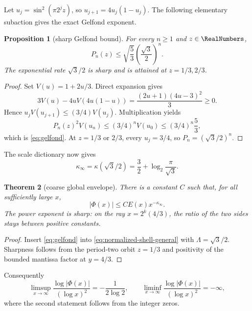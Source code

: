 \documentclass[11pt,oneside]{article}
\newtheorem{theorem}{Theorem}[section]
\newtheorem{proposition}[theorem]{Proposition}
\theoremstyle{definition}
\theoremstyle{remark}
\begin{document}
Let \(u_j=\sin^2(\pi2^jz)\), so
\(u_{j+1}=4u_j(1-u_j)\).  The following elementary subaction gives the exact
Gelfond exponent.

\begin{proposition}[sharp Gelfond bound]
\label{prop:gelfond}
For every \(n\ge1\) and \(z\in\RealNumbers\),
\begin{equation}
 P_n(z)\le\sqrt{\frac53}\left(\frac{\sqrt3}{2}\right)^n.
 \label{eq:gelfond}
\end{equation}
The exponential rate \(\sqrt3/2\) is sharp and is attained at
\(z=1/3,2/3\).
\end{proposition}

\begin{proof}
Set \(V(u)=1+2u/3\).  Direct expansion gives
\begin{equation}
 3V(u)-4uV(4u(1-u))
 =\frac{(2u+1)(4u-3)^2}{3}\ge0.
 \label{eq:subaction-identity}
\end{equation}
Hence
\(u_jV(u_{j+1})\le(3/4)V(u_j)\).  Multiplication yields
\[
 P_n(z)^2V(u_n)\le(3/4)^nV(u_0)
 \le(3/4)^n\frac53,
\]
which is \eqref{eq:gelfond}.  At \(z=1/3\) or \(2/3\), every
\(u_j=3/4\), so \(P_n=(\sqrt3/2)^n\).
\end{proof}

The scale dictionary now gives
\begin{equation}
 \kappa_\infty
 =\kappa(\sqrt3/2)
 =\frac32+\log_2\frac\pi{\sqrt3}.
 \label{eq:kappainfty}
\end{equation}

\begin{theorem}[coarse global envelope]
\label{thm:coarse-envelope}
There is a constant \(C\) such that, for all sufficiently large \(x\),
\begin{equation}
 |\Phi(x)|\le C E(x)x^{-\kappa_\infty}.
 \label{eq:coarse-envelope}
\end{equation}
The power exponent is sharp: on the ray \(x=2^k(4/3)\), the ratio of the two
sides stays between positive constants.
\end{theorem}

\begin{proof}
Insert \eqref{eq:gelfond} into
\eqref{eq:normalized-shell-general} with
\(\Lambda=\sqrt3/2\).  Sharpness follows from the period-two orbit
\(z=1/3\) and positivity of the bounded mantissa factor at \(y=4/3\).
\end{proof}

Consequently
\begin{equation}
 \limsup_{x\to\infty}\frac{\log|\Phi(x)|}{(\log x)^2}
 =-\frac1{2\log2},
 \qquad
 \liminf_{x\to\infty}\frac{\log|\Phi(x)|}{(\log x)^2}=-\infty,
 \label{eq:universal-lims}
\end{equation}
where the second statement follows from the integer zeros.
\end{document}
